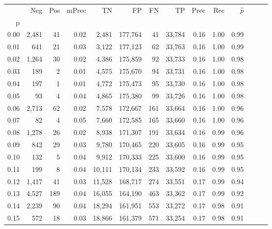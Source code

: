 \begin{tabular}{rrrrrrrrrrrrrr}
\toprule
{} &     Neg &    Pos & mPrec &       TN &       FP &      FN &      TP &  Prec &   Rec & $\hat{p}$ \\
p    &         &        &       &          &          &         &         &       &       &           \\
\midrule
0.00 &   2,481 &     41 &  0.02 &    2,481 &  177,764 &      41 &  33,784 &  0.16 &  1.00 &      0.99 \\
0.01 &     641 &     21 &  0.03 &    3,122 &  177,123 &      62 &  33,763 &  0.16 &  1.00 &      0.99 \\
0.02 &   1,264 &     30 &  0.02 &    4,386 &  175,859 &      92 &  33,733 &  0.16 &  1.00 &      0.98 \\
0.03 &     189 &      2 &  0.01 &    4,575 &  175,670 &      94 &  33,731 &  0.16 &  1.00 &      0.98 \\
0.04 &     197 &      1 &  0.01 &    4,772 &  175,473 &      95 &  33,730 &  0.16 &  1.00 &      0.98 \\
0.05 &      93 &      4 &  0.04 &    4,865 &  175,380 &      99 &  33,726 &  0.16 &  1.00 &      0.98 \\
0.06 &   2,713 &     62 &  0.02 &    7,578 &  172,667 &     161 &  33,664 &  0.16 &  1.00 &      0.96 \\
0.07 &      82 &      4 &  0.05 &    7,660 &  172,585 &     165 &  33,660 &  0.16 &  1.00 &      0.96 \\
0.08 &   1,278 &     26 &  0.02 &    8,938 &  171,307 &     191 &  33,634 &  0.16 &  0.99 &      0.96 \\
0.09 &     842 &     29 &  0.03 &    9,780 &  170,465 &     220 &  33,605 &  0.16 &  0.99 &      0.95 \\
0.10 &     132 &      5 &  0.04 &    9,912 &  170,333 &     225 &  33,600 &  0.16 &  0.99 &      0.95 \\
0.11 &     199 &      8 &  0.04 &   10,111 &  170,134 &     233 &  33,592 &  0.16 &  0.99 &      0.95 \\
0.12 &   1,417 &     41 &  0.03 &   11,528 &  168,717 &     274 &  33,551 &  0.17 &  0.99 &      0.94 \\
0.13 &   4,527 &    189 &  0.04 &   16,055 &  164,190 &     463 &  33,362 &  0.17 &  0.99 &      0.92 \\
0.14 &   2,239 &     90 &  0.04 &   18,294 &  161,951 &     553 &  33,272 &  0.17 &  0.98 &      0.91 \\
0.15 &     572 &     18 &  0.03 &   18,866 &  161,379 &     571 &  33,254 &  0.17 &  0.98 &      0.91 \\

\end{tabular}
